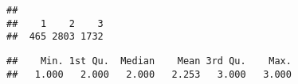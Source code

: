 \documentclass[]{article}
\newenvironment{Shaded}{\begin{snugshade}}{\end{snugshade}}
\newcommand{\KeywordTok}[1]{\textcolor[rgb]{0.13,0.29,0.53}{\textbf{#1}}}
\newcommand{\DataTypeTok}[1]{\textcolor[rgb]{0.13,0.29,0.53}{#1}}
\newcommand{\DecValTok}[1]{\textcolor[rgb]{0.00,0.00,0.81}{#1}}
\newcommand{\StringTok}[1]{\textcolor[rgb]{0.31,0.60,0.02}{#1}}
\newcommand{\OperatorTok}[1]{\textcolor[rgb]{0.81,0.36,0.00}{\textbf{#1}}}
\newcommand{\NormalTok}[1]{#1}
\begin{document}
\begin{verbatim}
## 
##    1    2    3 
##  465 2803 1732
\end{verbatim}

\begin{verbatim}
##    Min. 1st Qu.  Median    Mean 3rd Qu.    Max. 
##   1.000   2.000   2.000   2.253   3.000   3.000
\end{verbatim}

\begin{Shaded}
\end{Shaded}
\end{document}
